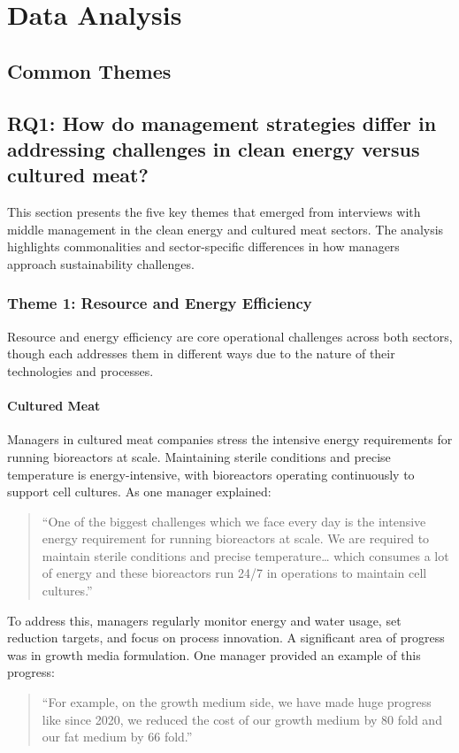 
\section{Data Analysis}

\subsection*{Common Themes}

\subsection{RQ1: How do management strategies differ in addressing challenges in clean energy versus cultured meat?}
This section presents the five key themes that emerged from interviews with middle management in the clean energy and cultured meat sectors. The analysis highlights commonalities and sector-specific differences in how managers approach sustainability challenges.

\subsubsection{Theme 1: Resource and Energy Efficiency}
Resource and energy efficiency are core operational challenges across both sectors, though each addresses them in different ways due to the nature of their technologies and processes.

\paragraph{Cultured Meat}
Managers in cultured meat companies stress the intensive energy requirements for running bioreactors at scale. Maintaining sterile conditions and precise temperature is energy-intensive, with bioreactors operating continuously to support cell cultures. As one manager explained:
\begin{quote}
	“One of the biggest challenges which we face every day is the intensive energy requirement for running bioreactors at scale. We are required to maintain sterile conditions and precise temperature… which consumes a lot of energy and these bioreactors run 24/7 in operations to maintain cell cultures.”
\end{quote}
To address this, managers regularly monitor energy and water usage, set reduction targets, and focus on process innovation. A significant area of progress was in growth media formulation. One manager provided an example of this progress:
\begin{quote}
	“For example, on the growth medium side, we have made huge progress like since 2020, we reduced the cost of our growth medium by 80 fold and our fat medium by 66 fold.”
\end{quote}

